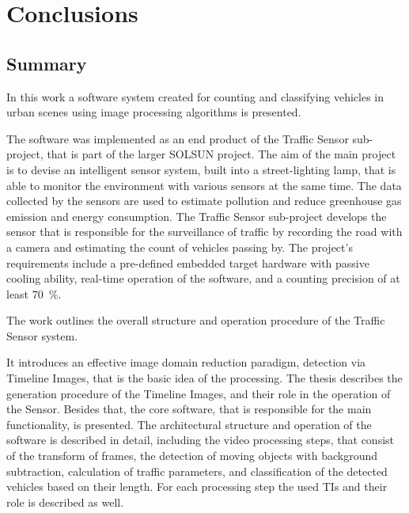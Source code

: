 \renewcommand{\thechapter}{\Alph{chapter}}
\setcounter{chapter}{3}  %
\chapter*{Conclusions}\label{chap:Conclusions}
\setcounter{equation}{0} 
\setcounter{section}{0}
\section{Summary}
In this work a software system created for counting and classifying vehicles in urban scenes using image processing algorithms is presented.

The software was implemented as an end product of the Traffic Sensor sub-project, that is part of the larger SOLSUN project.
The aim of the main project is to devise an intelligent sensor system, built into a street-lighting lamp, that is able to monitor the environment with various sensors at the same time.
The data collected by the sensors are used to estimate pollution and reduce greenhouse gas emission and energy consumption. 
The Traffic Sensor sub-project develops the sensor that is responsible for the surveillance of traffic by recording the road with a camera and estimating the count of vehicles passing by.
The project's requirements include a pre-defined embedded target hardware with passive cooling ability, real-time operation of the software, and a counting precision of at least \SI{70}{\%}.

The work outlines the overall structure and operation procedure of the Traffic Sensor system. 

It introduces an effective image domain reduction paradigm, detection via Timeline Images, that is the basic idea of the processing.
The thesis describes the generation procedure of the Timeline Images, and their role in the operation of the Sensor.
Besides that, the core software, that is responsible for the main functionality, is presented.
The architectural structure and operation of the software is described in detail, including the video processing steps, that consist of the transform of frames, the detection of moving objects with background subtraction, calculation of traffic parameters, and classification of the detected vehicles based on their length.
For each processing step the used TIs and their role is described as well.

